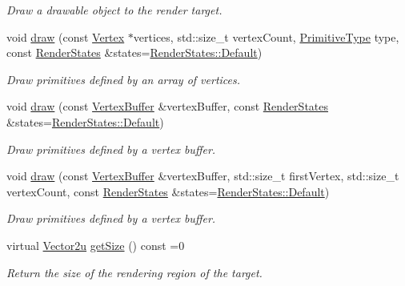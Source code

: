 \begin{DoxyCompactItemize}
\begin{DoxyCompactList}\small\item\em Draw a drawable object to the render target. \end{DoxyCompactList}\item 
void \mbox{\hyperlink{classsf_1_1_render_target_a976bc94057799eb9f8a18ac5fdfd9b73}{draw}} (const \mbox{\hyperlink{classsf_1_1_vertex}{Vertex}} $\ast$vertices, std\+::size\+\_\+t vertex\+Count, \mbox{\hyperlink{group__graphics_ga5ee56ac1339984909610713096283b1b}{Primitive\+Type}} type, const \mbox{\hyperlink{classsf_1_1_render_states}{Render\+States}} \&states=\mbox{\hyperlink{classsf_1_1_render_states_ad29672df29f19ce50c3021d95f2bb062}{Render\+States\+::\+Default}})
\begin{DoxyCompactList}\small\item\em Draw primitives defined by an array of vertices. \end{DoxyCompactList}\item 
void \mbox{\hyperlink{classsf_1_1_render_target_a3dc4d06f081d36ca1e8f1a1298d49abc}{draw}} (const \mbox{\hyperlink{classsf_1_1_vertex_buffer}{Vertex\+Buffer}} \&vertex\+Buffer, const \mbox{\hyperlink{classsf_1_1_render_states}{Render\+States}} \&states=\mbox{\hyperlink{classsf_1_1_render_states_ad29672df29f19ce50c3021d95f2bb062}{Render\+States\+::\+Default}})
\begin{DoxyCompactList}\small\item\em Draw primitives defined by a vertex buffer. \end{DoxyCompactList}\item 
void \mbox{\hyperlink{classsf_1_1_render_target_a07cb25d4557a30146b24b25b242310ea}{draw}} (const \mbox{\hyperlink{classsf_1_1_vertex_buffer}{Vertex\+Buffer}} \&vertex\+Buffer, std\+::size\+\_\+t first\+Vertex, std\+::size\+\_\+t vertex\+Count, const \mbox{\hyperlink{classsf_1_1_render_states}{Render\+States}} \&states=\mbox{\hyperlink{classsf_1_1_render_states_ad29672df29f19ce50c3021d95f2bb062}{Render\+States\+::\+Default}})
\begin{DoxyCompactList}\small\item\em Draw primitives defined by a vertex buffer. \end{DoxyCompactList}\item 
virtual \mbox{\hyperlink{classsf_1_1_vector2}{Vector2u}} \mbox{\hyperlink{classsf_1_1_render_target_a2e5ade2457d9fb4c4907ae5b3d9e94a5}{get\+Size}} () const =0
\begin{DoxyCompactList}\small\item\em Return the size of the rendering region of the target. \end{DoxyCompactList}\item 

\end{DoxyCompactItemize}
